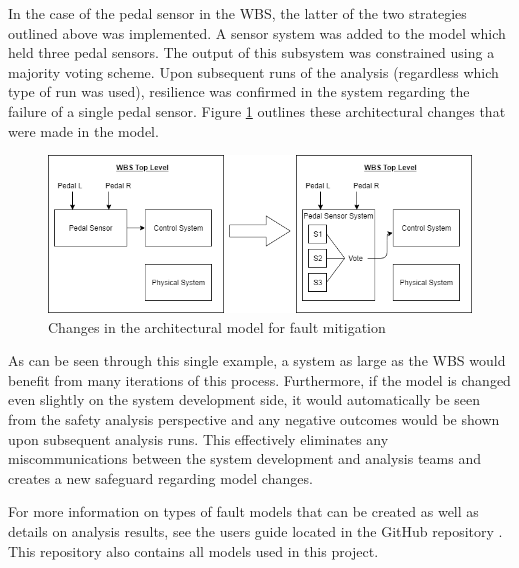 In the case of the pedal sensor in the WBS, the latter of the two strategies outlined above was implemented. A sensor system was added to the model which held three pedal sensors. The output of this subsystem was constrained using a majority voting scheme. Upon subsequent runs of the analysis (regardless which type of run was used), resilience was confirmed in the system regarding the failure of a single pedal sensor. Figure \ref{fig:sensorsystem} outlines these architectural changes that were made in the model.

\begin{figure}[htbp]
	\begin{center}
		\includegraphics[width=\textwidth]{images/sensorsystem.png}
	\end{center}
	\vspace{-0.3in}
	\caption{Changes in the architectural model for fault mitigation}
	\label{fig:sensorsystem}
\end{figure}

As can be seen through this single example, a system as large as the WBS would benefit from many iterations of this process. Furthermore, if the model is changed even slightly on the system development side, it would automatically be seen from the safety analysis perspective and any negative outcomes would be shown upon subsequent analysis runs. This effectively eliminates any miscommunications between the system development and analysis teams and creates a new safeguard regarding model changes. 

For more information on types of fault models that can be created as well as details on analysis results, see the users guide located in the GitHub repository \cite{SAGithub}. This repository also contains all models used in this project. 
